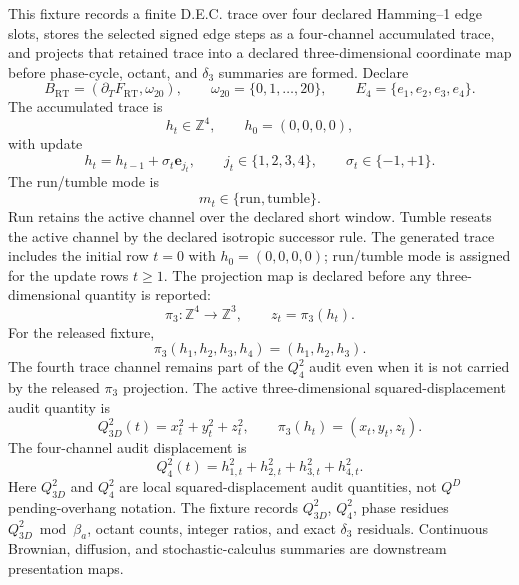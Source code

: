 This fixture records a finite D.E.C. trace over four declared Hamming--1 edge slots, stores the selected signed edge steps as a four-channel accumulated trace, and projects that retained trace into a declared three-dimensional coordinate map before phase-cycle, octant, and \(\delta_3\) summaries are formed. Declare
\[
B_{\mathrm{RT}}=(\partial_TF_{\mathrm{RT}},\omega_{20}),
\qquad
\omega_{20}=\{0,1,\ldots,20\},
\qquad
E_4=\{e_1,e_2,e_3,e_4\}.
\]
The accumulated trace is
\[
h_t\in\mathbb Z^4,
\qquad
h_0=(0,0,0,0),
\]
with update
\[
h_t=h_{t-1}+\sigma_t\mathbf e_{j_t},
\qquad
j_t\in\{1,2,3,4\},
\qquad
\sigma_t\in\{-1,+1\}.
\]
The run/tumble mode is
\[
m_t\in\{\mathrm{run},\mathrm{tumble}\}.
\]
Run retains the active channel over the declared short window. Tumble reseats the active channel by the declared isotropic successor rule. The generated trace includes the initial row \(t=0\) with \(h_0=(0,0,0,0)\); run/tumble mode is assigned for the update rows \(t\ge1\). The projection map is declared before any three-dimensional quantity is reported:
\[
\pi_3:\mathbb Z^4\to\mathbb Z^3,
\qquad
z_t=\pi_3(h_t).
\]
For the released fixture,
\[
\pi_3(h_1,h_2,h_3,h_4)=(h_1,h_2,h_3).
\]
The fourth trace channel remains part of the \(Q^2_4\) audit even when it is not carried by the released \(\pi_3\) projection. The active three-dimensional squared-displacement audit quantity is
\[
Q^2_{3D}(t)=x_t^2+y_t^2+z_t^2,
\qquad
\pi_3(h_t)=(x_t,y_t,z_t).
\]
The four-channel audit displacement is
\[
Q^2_4(t)=h_{1,t}^2+h_{2,t}^2+h_{3,t}^2+h_{4,t}^2.
\]
Here \(Q^2_{3D}\) and \(Q^2_4\) are local squared-displacement audit quantities, not \(Q^D\) pending-overhang notation. The fixture records \(Q^2_{3D}\), \(Q^2_4\), phase residues \(Q^2_{3D}\bmod \beta_a\), octant counts, integer ratios, and exact \(\delta_3\) residuals. Continuous Brownian, diffusion, and stochastic-calculus summaries are downstream presentation maps.

